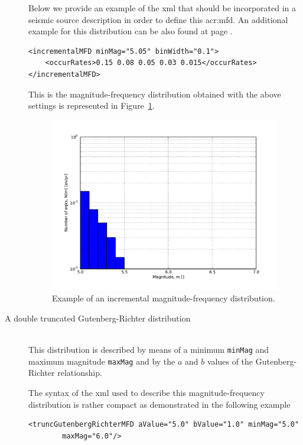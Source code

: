 \begin{description}
    Below we provide an example of the xml that should
    be incorporated in a seismic source description in order to define 
    this \gls{acr:mfd}. An additional example for this distribution can
    be also found at page \pageref{example_incremental_mfd}.
\begin{Verbatim}[frame=single, commandchars=\\\{\}, fontsize=\footnotesize]
<incrementalMFD minMag="5.05" binWidth="0.1">
    <occurRates>0.15 0.08 0.05 0.03 0.015</occurRates>
</incrementalMFD>
\end{Verbatim}
    This is the magnitude-frequency distribution obtained with the above
    settings is represented in Figure~\ref{fig:evenly_discretized_mfd}.
\begin{figure}[!ht]
\centering
\includegraphics[width=12cm]{figures/hazard/ed_mfd.pdf}
\caption{Example of an incremental magnitude-frequency distribution.}
\label{fig:evenly_discretized_mfd}
\end{figure}
%
\item[A double truncated Gutenberg-Richter distribution] \hfill \\
    This distribution is de\-scribed by means of a minimum \texttt{minMag}
    and maximum magnitude \texttt{maxMag} and by the $a$ and $b$ values 
    of the Gutenberg-Richter relationship.

    The syntax of the xml used to describe this magnitude-frequency 
    distribution is rather compact as demonstrated in the following example
\begin{Verbatim}[frame=single, commandchars=\\\{\}, fontsize=\footnotesize]
<truncGutenbergRichterMFD aValue="5.0" bValue="1.0" minMag="5.0" 
        maxMag="6.0"/>
\end{Verbatim}


\end{description}
